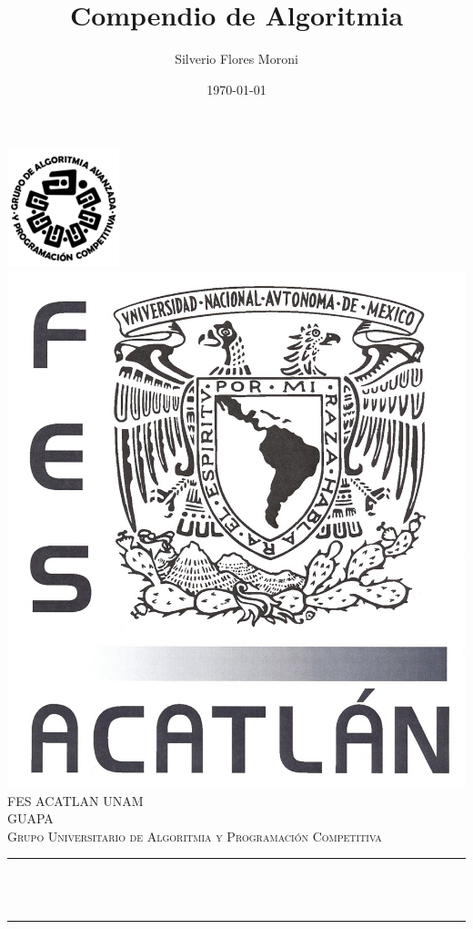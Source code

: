 \documentclass[12pt]{article}
\title{Compendio de Algoritmia}								%
\author{Silverio Flores Moroni}								%
\date{\today}											%
\makeatletter
\let\thetitle\@title
\makeatother
\begin{document}

\begin{titlepage}
	\centering
    \vspace*{0.5 cm}
    \includegraphics[scale = 1.0]{algoritmia.png}\hspace{50mm}
    \includegraphics[scale = 0.20]{escudo-acatlan.jpg}\vspace{30mm}\\    %
    \textsc{\LARGE FES ACATLAN UNAM}\\[1.5 cm]	%
	\textsc{\Large GUAPA}\\[0.5 cm]				%
	\textsc{\large Grupo Universitario de Algoritmia y Programaci\'on Competitiva}\\[0.5 cm]				%
	\rule{\linewidth}{0.2 mm} \\[0.4 cm]
	{ \huge \bfseries \thetitle}\\
	\rule{\linewidth}{0.2 mm} \\[1.5 cm]
	

\end{titlepage}
\end{document}
